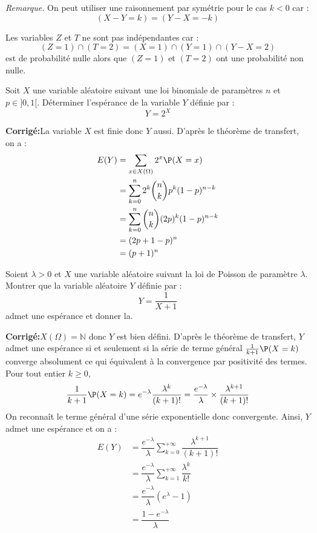 \documentclass[a4paper,twoside,french,11pt]{VcCours}
\newcommand{\corr}{\textbf{Corrigé:}}
\begin{document}
\textit{Remarque.} On peut utiliser une raisonnement par symétrie pour le cas $k <0$ car :
$$ (X-Y=k) = (Y-X=-k)$$


Les variables $Z$ et $T$ ne sont pas indépendantes car :
$$ (Z=1) \cap (T=2) = (X =1) \cap (Y = 1) \cap (Y-X =2)$$
est de probabilité nulle alors que $(Z=1)$ et $(T=2)$ ont une probabilité non nulle.


\begin{Exercice}{} Soit $X$ une variable aléatoire suivant une loi binomiale de paramètres $n$ et $p \in ]0,1[$. Déterminer l'espérance de la variable $Y$ définie par :
  \[
  Y = 2^X
  \]
\end{Exercice}

\corr La variable $X$ est finie donc $Y$ aussi. D'après le théorème de transfert, on a :
\begin{align*}
E(Y) & = \sum_{x \in X(\Omega)} 2^x \P(X=x) \\
& = \sum_{k=0}^n 2^k \binom{n}{k} p^k (1-p)^{n-k} \\
& =  \sum_{k=0}^n \binom{n}{k} (2p)^k (1-p)^{n-k} \\
& = (2p+1-p)^n \\
& = (p+1)^n
\end{align*}

\begin{Exercice}{} Soient $\lambda >0$ et $X$ une variable aléatoire suivant la loi de Poisson de paramètre $\lambda$. Montrer que la variable aléatoire $Y$ définie par :
$$ Y = \frac{1}{X+1}$$
admet une espérance et donner la.
\end{Exercice}

\corr $X(\Omega)= \mathbb{N}$ donc $Y$ est bien défini. D'après le théorème de transfert, $Y$ admet une espérance si et seulement si la série de terme général $\tfrac{1}{k+1} \P(X=k)$ converge absolument ce qui équivalent à la convergence par positivité des termes. Pour tout entier $k \geq 0$,
$$ \dfrac{1}{k+1} \P(X=k) = e^{-\lambda} \dfrac{\lambda^k}{(k+1)!} = \dfrac{e^{-\lambda}}{\lambda} \times \dfrac{\lambda^{k+1}}{(k+1)!}$$
On reconnaît le terme général d'une série exponentielle donc convergente. Ainsi, $Y$ admet une espérance et on a :
\begin{align*}
E(Y) & = \dfrac{e^{-\lambda}}{\lambda} \sum_{k=0}^{+ \infty}\dfrac{\lambda^{k+1}}{(k+1)!} \\
& = \dfrac{e^{-\lambda}}{\lambda} \sum_{k=1}^{+ \infty}\dfrac{\lambda^{k}}{k!} \\
& = \dfrac{e^{-\lambda}}{\lambda} (e^{\lambda}-1) \\
& = \dfrac{1- e^{-\lambda}}{\lambda}
\end{align*}
\end{document}
